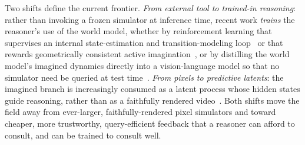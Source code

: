 Two shifts define the current frontier. \emph{From external tool to trained-in reasoning}: rather than invoking a frozen simulator at inference time, recent work \emph{trains} the reasoner's use of the world model, whether by reinforcement learning that supervises an internal state-estimation and transition-modeling loop~\cite{wang2025vagen} or that rewards geometrically consistent active imagination~\cite{cao2025spatialdreamer}, or by distilling the world model's imagined dynamics directly into a vision-language model so that no simulator need be queried at test time~\cite{zhang2026world2vlm}. \emph{From pixels to predictive latents}: the imagined branch is increasingly consumed as a latent process whose hidden states guide reasoning, rather than as a faithfully rendered video~\cite{assran2023jepa,assran2025vjepa,chen20253dthinker}. Both shifts move the field away from ever-larger, faithfully-rendered pixel simulators and toward cheaper, more trustworthy, query-efficient feedback that a reasoner can afford to consult, and can be trained to consult well.
